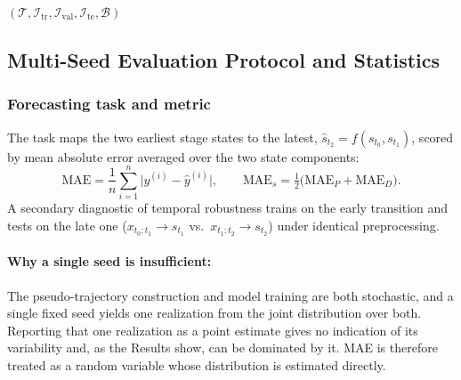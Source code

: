 \documentclass[pdflatex,sn-mathphys-num]{sn-jnl}
\theoremstyle{thmstyleone}%
\theoremstyle{thmstyletwo}%
\theoremstyle{thmstylethree}%
\begin{document}
\begin{algorithm}[!htbp]
\BlankLine
{}
\BlankLine
\Return $(\mathcal{T},\mathcal{I}_{\mathrm{tr}},\mathcal{I}_{\mathrm{val}},\mathcal{I}_{\mathrm{te}},\mathcal{B})$
\end{algorithm}

\subsection{\textbf{Multi-Seed Evaluation Protocol and Statistics}}
\label{subsec:protocol}

\subsubsection{Forecasting task and metric} The task maps the two earliest stage states to the latest, $\hat{s}_{t_2}=f(s_{t_0},s_{t_1})$, scored by mean absolute error averaged over the two state components:
\begin{equation}
\mathrm{MAE}=\frac{1}{n}\sum_{i=1}^{n}\big|y^{(i)}-\hat{y}^{(i)}\big|, \qquad
\mathrm{MAE}_{s}=\tfrac{1}{2}\big(\mathrm{MAE}_{P}+\mathrm{MAE}_{D}\big).
\label{eq:mae}
\end{equation}
A secondary diagnostic of temporal robustness trains on the early transition and tests on the late one ($x_{t_0:t_1}\!\rightarrow\!s_{t_1}$ vs.\ $x_{t_1:t_2}\!\rightarrow\!s_{t_2}$) under identical preprocessing.

\paragraph{Why a single seed is insufficient:} The pseudo-trajectory construction and model training are both stochastic, and a single fixed seed yields one realization from the joint distribution over both. Reporting that one realization as a point estimate gives no indication of its variability and, as the Results show, can be dominated by it. MAE is therefore treated as a random variable whose distribution is estimated directly.
\end{document}
